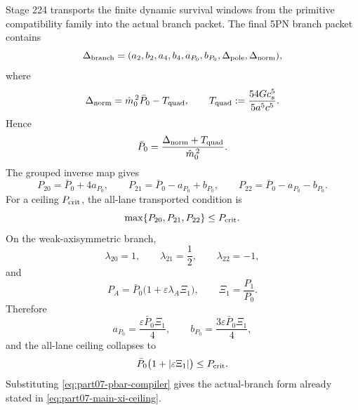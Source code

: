 Stage 224 transports the finite dynamic survival windows from the primitive compatibility family into the actual branch packet.  The final 5PN branch packet contains
\begin{equation}
\label{eq:part07-branch-packet-prefactor}
\Delta_{\rm branch}
=(a_2,b_2,a_4,b_4,a_{P_0},b_{P_0},\Delta_{\rm pole},\Delta_{\rm norm}),
\end{equation}
where
\begin{equation}
\label{eq:part07-delta-norm}
\Delta_{\rm norm}=\hat m_0^{\,2}\bar P_0-T_{\rm quad},
\qquad
T_{\rm quad}:=\frac{54Gc_s^5}{5a^5c^5}.
\end{equation}
Hence
\begin{equation}
\label{eq:part07-pbar-compiler}
\bar P_0=\frac{\Delta_{\rm norm}+T_{\rm quad}}{\hat m_0^{\,2}}.
\end{equation}
The grouped inverse map gives
\begin{equation}
\label{eq:part07-prefactor-lanes}
P_{20}=\bar P_0+4a_{P_0},
\qquad
P_{21}=\bar P_0-a_{P_0}+b_{P_0},
\qquad
P_{22}=\bar P_0-a_{P_0}-b_{P_0}.
\end{equation}
For a ceiling \(P_{\rm crit}\), the all-lane transported condition is
\begin{equation}
\label{eq:part07-max-prefactor-ceiling}
\max\{P_{20},P_{21},P_{22}\}\le P_{\rm crit}.
\end{equation}
On the weak-axisymmetric branch,
\begin{equation}
\label{eq:part07-lambda-signature}
\lambda_{20}=1,
\qquad
\lambda_{21}=\frac12,
\qquad
\lambda_{22}=-1,
\end{equation}
and
\begin{equation}
\label{eq:part07-xi-prefactor-form}
P_A=\bar P_0\bigl(1+\varepsilon\lambda_A\Xi_1\bigr),
\qquad
\Xi_1=\frac{P_1}{P_0}.
\end{equation}
Therefore
\begin{equation}
\label{eq:part07-ap0-bp0-xi}
a_{P_0}=\frac{\varepsilon\bar P_0\Xi_1}{4},
\qquad
b_{P_0}=\frac{3\varepsilon\bar P_0\Xi_1}{4},
\end{equation}
and the all-lane ceiling collapses to
\begin{equation}
\label{eq:part07-xi-prefactor-ceiling}
\bar P_0\bigl(1+|\varepsilon\Xi_1|\bigr)\le P_{\rm crit}.
\end{equation}
Substituting \cref{eq:part07-pbar-compiler} gives the actual-branch form already stated in \cref{eq:part07-main-xi-ceiling}.

